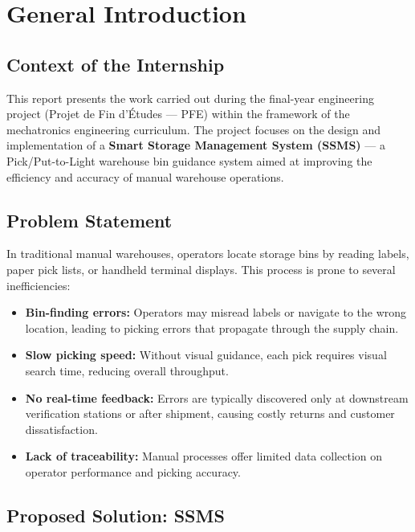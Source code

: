 \chapter{General Introduction}
\label{ch:introduction}


\section{Context of the Internship}
\label{sec:context}

This report presents the work carried out during the final-year engineering project (Projet de Fin d'\'Etudes --- PFE) within the framework of the mechatronics engineering curriculum. The project focuses on the design and implementation of a \textbf{Smart Storage Management System (SSMS)} --- a Pick/Put-to-Light warehouse bin guidance system aimed at improving the efficiency and accuracy of manual warehouse operations.

\section{Problem Statement}
\label{sec:problem}

In traditional manual warehouses, operators locate storage bins by reading labels, paper pick lists, or handheld terminal displays. This process is prone to several inefficiencies:
\begin{itemize}
  \item \textbf{Bin-finding errors:} Operators may misread labels or navigate to the wrong location, leading to picking errors that propagate through the supply chain.
  \item \textbf{Slow picking speed:} Without visual guidance, each pick requires visual search time, reducing overall throughput.
  \item \textbf{No real-time feedback:} Errors are typically discovered only at downstream verification stations or after shipment, causing costly returns and customer dissatisfaction.
  \item \textbf{Lack of traceability:} Manual processes offer limited data collection on operator performance and picking accuracy.
\end{itemize}

\section{Proposed Solution: SSMS}
\label{sec:solution}

